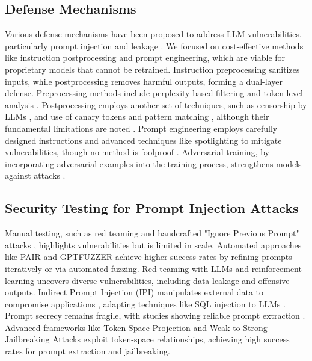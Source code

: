 \subsection{Defense Mechanisms}

Various defense mechanisms have been proposed to address LLM vulnerabilities, particularly prompt injection and leakage \cite{shayegani2023surveyvulnerabilitieslargelanguage,Yao_2024}. We focused on cost-effective methods like instruction postprocessing and prompt engineering, which are viable for proprietary models that cannot be retrained. Instruction preprocessing sanitizes inputs, while postprocessing removes harmful outputs, forming a dual-layer defense. Preprocessing methods include perplexity-based filtering \cite{Jain2023BaselineDF,Xu2022ExploringTU} and token-level analysis \cite{Kumar2023CertifyingLS}. Postprocessing employs another set of techniques, such as censorship by LLMs \cite{Helbling2023LLMSD,Inan2023LlamaGL}, and use of canary tokens and pattern matching \cite{vigil-llm,rebuff}, although their fundamental limitations are noted \cite{Glukhov2023LLMCA}. Prompt engineering employs carefully designed instructions \cite{Schulhoff2024ThePR} and advanced techniques like spotlighting \cite{Hines2024DefendingAI} to mitigate vulnerabilities, though no method is foolproof \cite{schulhoff-etal-2023-ignore}. Adversarial training, by incorporating adversarial examples into the training process, strengthens models against attacks \cite{Bespalov2024TowardsBA,Shaham2015UnderstandingAT}.

\subsection{Security Testing for Prompt Injection Attacks}

Manual testing, such as red teaming \cite{ganguli2022redteaminglanguagemodels} and handcrafted "Ignore Previous Prompt" attacks \cite{Perez2022IgnorePP}, highlights vulnerabilities but is limited in scale. Automated approaches like PAIR \cite{chao2024jailbreakingblackboxlarge} and GPTFUZZER \cite{Yu2023GPTFUZZERRT} achieve higher success rates by refining prompts iteratively or via automated fuzzing. Red teaming with LLMs \cite{Perez2022RedTL} and reinforcement learning \cite{anonymous2024diverse} uncovers diverse vulnerabilities, including data leakage and offensive outputs. Indirect Prompt Injection (IPI) manipulates external data to compromise applications \cite{Greshake2023NotWY}, adapting techniques like SQL injection to LLMs \cite{Liu2023PromptIA}. Prompt secrecy remains fragile, with studies showing reliable prompt extraction \cite{Zhang2023EffectivePE}. Advanced frameworks like Token Space Projection \cite{Maus2023AdversarialPF} and Weak-to-Strong Jailbreaking Attacks \cite{zhao2024weaktostrongjailbreakinglargelanguage} exploit token-space relationships, achieving high success rates for prompt extraction and jailbreaking.

